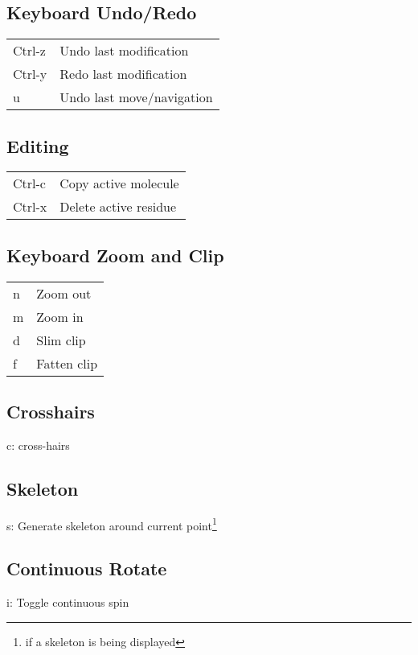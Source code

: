 \documentclass[twocolumn]{article}
\begin{document}
\subsection{Keyboard Undo/Redo}
\begin{tabular}{ll}

  Ctrl-z & Undo last modification   \\
  Ctrl-y & Redo last modification   \\
  u & Undo last move/navigation     \\
\end{tabular}

\subsection{Editing}
\begin{tabular}{ll}

  Ctrl-c & Copy active molecule   \\
  Ctrl-x & Delete active residue  \\
\end{tabular}
	

\subsection{Keyboard Zoom and Clip}

\begin{tabular}{ll}

  n & Zoom out   \\
  m & Zoom in    \\
  d & Slim clip  \\
  f & Fatten clip\\
\end{tabular}

\subsection{Crosshairs}
c: cross-hairs

\subsection{Skeleton}
s: Generate skeleton around current point\footnote{if a skeleton is being
displayed}

\subsection{Continuous Rotate}
i: Toggle continuous spin
\end{document}
